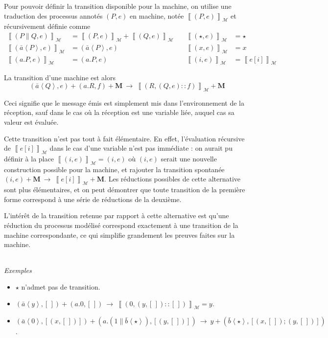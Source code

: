 \documentclass[11pt]{article}
\newcommand{\send}[2]{\bar{#1}\left\langle #2\right\rangle}
\newcommand{\block}[1]{\left[#1\right]}
\renewcommand{\empty}{\left[\,\right]}
\newcommand{\paren}[1]{\left(#1\right)}
\newcommand{\machine}[1]{\left\llbracket{#1}\right\rrbracket_{\mathcal{M}}}
\begin{document}
\textit{}

Pour pouvoir définir la transition disponible pour la machine, on utilise une traduction des processus annotés $(P,e)$ en machine, notée $\machine{(P,e)}$ et récursivement définie comme
\begin{align*}
\machine{(P\parallel Q,e)} &= \machine{(P,e)} + \machine{(Q,e)} &\quad
\machine{(\star,e)} &= \star \\
\machine{(\send{a}P,e)} &= (\send{a}P,e) &\quad
\machine{(x,e)} &= x \\
\machine{(a.P,e)} &= (a.P,e) &\quad
\machine{(i,e)} &= \machine{e\block{i}}
\end{align*}

La transition d'une machine est alors
\[(\send{a}Q,e) + (a.R,f) + \mathbf{M}\ \to\ \machine{(R, (Q,e)::f)} + \mathbf{M}\]

Ceci signifie que le message émis est simplement mis dans l'environnement de la réception, sauf dans le cas où la réception est une variable liée, auquel cas sa valeur est évaluée.


\label{expl_transition}
Cette transition n'est pas tout à fait élémentaire.
En effet, l'évaluation récursive de $\machine{e\block{i}}$ dans le cas d'une variable n'est pas immédiate : on aurait pu définir à la place $\machine{(i,e)} = (i,e)$ où $(i,e)$ serait une nouvelle construction possible pour la machine, et rajouter la transition spontanée $(i,e)+\mathbf{M}\ \to\  \machine{e\block{i}}+\mathbf{M}$. Les réductions possibles de cette alternative sont plus élémentaires, et on peut démontrer que toute transition de la première forme correspond à une série de réductions de la deuxième.

L'intérêt de la transition retenue par rapport à cette alternative est qu'une réduction du processus modélisé correspond exactement à une transition de la machine correspondante, ce qui simplifie grandement les preuves faites sur la machine.


\textit{\\Exemples}
\begin{itemize}
	\item $\star$ n'admet pas de transition.
	\item $(\send{a}y, \empty) + (a.0, \empty)\ \to\ \machine{(0, (y,\empty)::\empty)} = y$.
	\item $\paren{\send{a}0, \block{(x,\empty)}} + \paren{a.(1\parallel \send{b}\star), \block{(y,\empty)}}\ \to\ y + \paren{\send{b}\star, \block{\paren{x,\empty} ; \paren{y,\empty}}}$.
\end{itemize}
\end{document}

